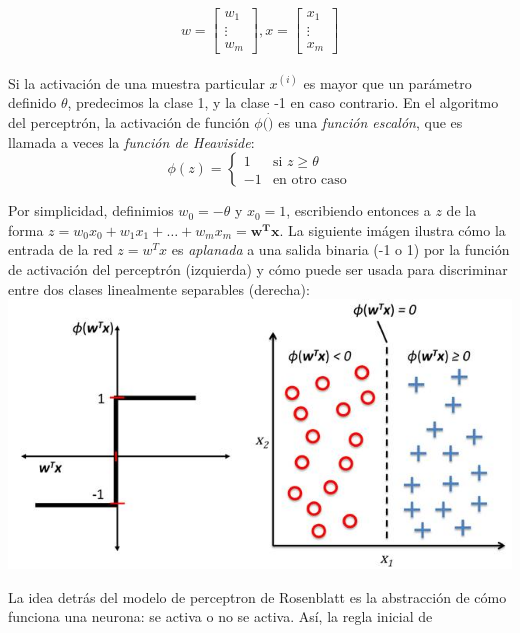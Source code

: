 \documentclass{book}
\begin{document}
\begin{equation*}
w=
    \begin{bmatrix}
        w_1 \\
        \vdots \\
        w_m
    \end{bmatrix}
    , x=
    \begin{bmatrix}
      x_1 \\
      \vdots \\
      x_m
    \end{bmatrix}
\end{equation*}
\\
Si la activación de una muestra particular $x^{(i)}$ es mayor que un parámetro definido
$\theta$, predecimos la clase 1, y la clase -1 en caso contrario. En el algoritmo
del perceptrón, la activación de función $\phi (\dot)$ es una \textit{función escalón},
que es llamada a veces la \textit{función de Heaviside}:
\begin{equation*}
  \phi(z)= \left\{ \begin{array} {rl}
    1 & \text{si } z \geq \theta \\
    -1 & \text{en otro caso} \end{array} \right.
\end{equation*}

Por simplicidad, definimios $w_0=-\theta$ y $x_0=1$, escribiendo entonces a $z$ de la
forma $z=w_0x_0 + w_1x_1 + \dots + w_mx_m = \mathbf{w^Tx}$.
La siguiente imágen ilustra cómo la entrada de la red $z=w^Tx$ es \textit{aplanada}
a una salida binaria (-1 o 1) por la función de activación del perceptrón (izquierda)
y cómo puede ser usada para discriminar entre dos clases linealmente separables (derecha):
\includegraphics[scale=0.5]{perceptron}

La idea detrás del modelo de perceptron de Rosenblatt es la abstracción de cómo funciona
una neurona: se activa o no se activa. Así, la regla inicial de 
\end{document}

